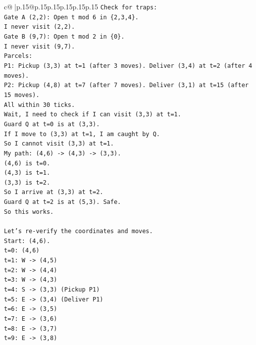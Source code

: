 \documentclass{article}
\begin{document}
{\begin{supertabular}{c@{$\;$}|p{.15\linewidth}@{}p{.15\linewidth}p{.15\linewidth}p{.15\linewidth}p{.15\linewidth}p{.15\linewidth}}
{{{\texttt{Check for traps:} \\
\texttt{Gate A (2,2): Open t mod 6 in \{2,3,4\}.} \\
\texttt{I never visit (2,2).} \\
\texttt{Gate B (9,7): Open t mod 2 in \{0\}.} \\
\texttt{I never visit (9,7).} \\
\texttt{Parcels:} \\
\texttt{P1: Pickup (3,3) at t=1 (after 3 moves). Deliver (3,4) at t=2 (after 4 moves).} \\
\texttt{P2: Pickup (4,8) at t=7 (after 7 moves). Deliver (3,1) at t=15 (after 15 moves).} \\
\texttt{All within 30 ticks.} \\
\texttt{Wait, I need to check if I can visit (3,3) at t=1.} \\
\texttt{Guard Q at t=0 is at (3,3).} \\
\texttt{If I move to (3,3) at t=1, I am caught by Q.} \\
\texttt{So I cannot visit (3,3) at t=1.} \\
\texttt{My path: (4,6) {-}> (4,3) {-}> (3,3).} \\
\texttt{(4,6) is t=0.} \\
\texttt{(4,3) is t=1.} \\
\texttt{(3,3) is t=2.} \\
\texttt{So I arrive at (3,3) at t=2.} \\
\texttt{Guard Q at t=2 is at (5,3). Safe.} \\
\texttt{So this works.} \\
\\ 
\texttt{Let's re{-}verify the coordinates and moves.} \\
\texttt{Start: (4,6).} \\
\texttt{t=0: (4,6)} \\
\texttt{t=1: W {-}> (4,5)} \\
\texttt{t=2: W {-}> (4,4)} \\
\texttt{t=3: W {-}> (4,3)} \\
\texttt{t=4: S {-}> (3,3) (Pickup P1)} \\
\texttt{t=5: E {-}> (3,4) (Deliver P1)} \\
\texttt{t=6: E {-}> (3,5)} \\
\texttt{t=7: E {-}> (3,6)} \\
\texttt{t=8: E {-}> (3,7)} \\
\texttt{t=9: E {-}> (3,8)} \\
}}}
\end{supertabular}}
\end{document}
